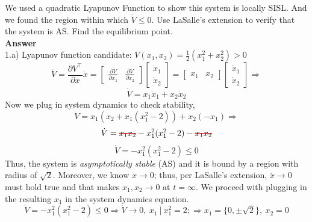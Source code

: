 \documentclass{homeworg}
\newcommand\hcancel[2][black]{\setbox0=\hbox{$#2$}%
\rlap{\raisebox{.45\ht0}{\textcolor{#1}{\rule{\wd0}{1pt}}}}#2}
\begin{document}
We used a quadratic Lyapunov Function to show this system is locally SISL.
And we found the region within which \(\dot{V} \leq 0\).
Use LaSalle’s extension to verify that the system is AS. Find the
equilibrium point.\\
\noindent
\textbf{Answer} \\
1.a) Lyapunov function candidate: \( V(x_1, x_2) = \frac{1}{2} (x_1^2 + x_2^2) > 0\)
\begin{equation*}
\dot{V} = \frac{\partial V^\top}{\partial x} \dot{x} =
\begin{bmatrix}
\frac{\partial V}{\partial x_1} & \frac{\partial V}{\partial x_2}
\end{bmatrix}
\begin{bmatrix}
\dot{x}_1 \\
\dot{x}_2
\end{bmatrix}
=
\begin{bmatrix}
  x_1 & x_2
  \end{bmatrix}
  \begin{bmatrix}
  \dot{x}_1 \\
  \dot{x}_2
  \end{bmatrix}
  \Rightarrow
\end{equation*}
\begin{equation*}
\dot{V} =
  x_1 \dot{x}_1 + x_2 \dot{x}_2
\end{equation*}
Now we plug in system dynamics to check stability,
\begin{equation*}
  \dot{V} = x_1 (x_2 + x_1 (x_1^2 -2)) + x_2(-x_1) \Rightarrow
\end{equation*}
\begin{equation*}
  \dot{V} = \hcancel[red]{x_1 x_2} - x_1^2(x_1^2 -2) - \hcancel[red]{x_1 x_2}
\end{equation*}
\begin{equation*}
  \dot{V} = - x_1^2(x_1^2 -2) \leq 0
\end{equation*}
Thus, the system is \emph{asymptotically stable} (AS) and it is bound by a region
with radius of \(\sqrt{2}\). Moreover, we know \(\dot{x} \rightarrow 0\); thus,
per LaSalle’s extension, \(\ddot{x} \rightarrow 0\) must hold true and that makes
\(x_1,x_2 \rightarrow 0\) at \(t= \infty\). We proceed with plugging in the
resulting \(x_1\) in the system dynamics equation.
\begin{equation*}
  \dot{V} = - x_1^2(x_1^2 -2) \leq 0 \Rightarrow \dot{V} \rightarrow 0,~x_1~|~x_{1}^{2}  = 2; \Rightarrow x_1 = \{0, \pm \sqrt{2} \},~x_2 = 0
\end{equation*}
\end{document}

